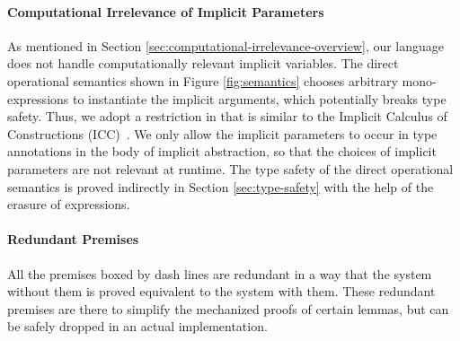 \paragraph{Computational Irrelevance of Implicit Parameters}

As mentioned in Section \ref{sec:computational-irrelevance-overview}, our language
does not handle computationally relevant implicit variables.
The direct operational semantics shown in Figure \ref{fig:semantics} chooses
arbitrary mono-expressions to instantiate the implicit arguments,
which potentially breaks type safety.
Thus, we adopt a restriction in  that is similar to the
Implicit Calculus of Constructions (ICC)~\citep{miquel2001implicit}.
We only allow the implicit parameters to occur in type annotations in the
body of implicit abstraction, so that the choices of implicit parameters are not
relevant at runtime. The type safety of the direct operational semantics is
proved indirectly in Section \ref{sec:type-safety} with the help of the
erasure of expressions.

\paragraph{Redundant Premises}

All the premises boxed by dash lines are redundant in a way that
the system without them is proved equivalent to the system with them.
These redundant premises are there to simplify the mechanized proofs of
certain lemmas, but can be safely dropped in an actual implementation.

